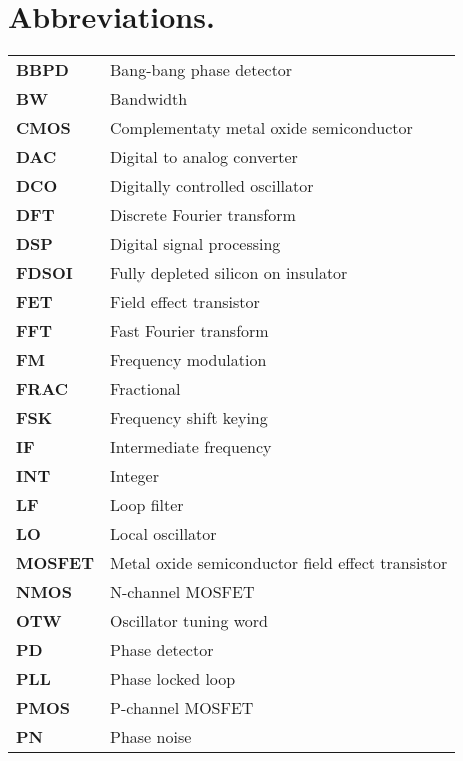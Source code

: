 	\pagebreak
	\null\pagebreak
	\section*{Abbreviations.}

	\begin{tabular}{@{}ll}
		\textbf{\textsf{BBPD}} & Bang-bang phase detector 	\\
		\textbf{\textsf{BW}} &  Bandwidth	\\
		\textbf{\textsf{CMOS}} & Complementaty metal oxide semiconductor 	\\
		\textbf{\textsf{DAC}}& 	Digital to analog converter\\
		\textbf{\textsf{DCO}}& 	Digitally controlled oscillator\\
		\textbf{\textsf{DFT}}& 	Discrete Fourier transform\\
		\textbf{\textsf{DSP}} &  Digital signal processing	\\
		\textbf{\textsf{FDSOI}} &  Fully depleted silicon on insulator	\\
		\textbf{\textsf{FET}} &  Field effect transistor	\\
		\textbf{\textsf{FFT}} &  Fast Fourier transform	\\
		\textbf{\textsf{FM}} &  Frequency modulation	\\
		\textbf{\textsf{FRAC}} & Fractional 	\\
		\textbf{\textsf{FSK}} &  Frequency shift keying	\\
		\textbf{\textsf{IF}} &  Intermediate frequency	\\
		\textbf{\textsf{INT}} & Integer	\\
		\textbf{\textsf{LF}} &  Loop filter	\\
		\textbf{\textsf{LO}} &  Local oscillator	\\
		\textbf{\textsf{MOSFET}} & Metal oxide semiconductor field effect transistor	\\
		\textbf{\textsf{NMOS}} & N-channel MOSFET 	\\
		\textbf{\textsf{OTW}} &  Oscillator tuning word	\\
		\textbf{\textsf{PD}} &  Phase detector	\\
		\textbf{\textsf{PLL}} &  Phase locked loop	\\
		\textbf{\textsf{PMOS}} &  P-channel MOSFET	\\
		\textbf{\textsf{PN}} &  Phase noise	\\

\end{tabular}
